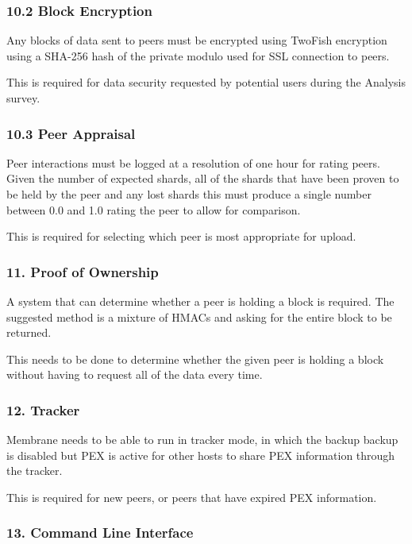 \documentclass[11pt, a4paper, twoside]{report}
\begin{document}
\subsubsection{10.2 Block Encryption}
Any blocks of data sent to peers must be encrypted using TwoFish encryption using a SHA-256 hash of the private modulo used for SSL connection to peers.

This is required for data security requested by potential users during the Analysis survey.

\subsubsection{10.3 Peer Appraisal}

Peer interactions must be logged at a resolution of one hour for rating peers. Given the number of expected shards, all of the shards that have been proven to be held by the peer and any lost shards this must produce a single number between 0.0 and 1.0 rating the peer to allow for comparison.

This is required for selecting which peer is most appropriate for upload.

\subsubsection{11. Proof of Ownership}

A system that can determine whether a peer is holding a block is required. The suggested method is a mixture of HMACs and asking for the entire block to be returned. 

This needs to be done to determine whether the given peer is holding a block without having to request all of the data every time.

\subsubsection{12. Tracker}

Membrane needs to be able to run in tracker mode, in which the backup backup is disabled but PEX is active for other hosts to share PEX information through the tracker.

This is required for new peers, or peers that have expired PEX information.

\subsubsection{13. Command Line Interface}
\end{document}
